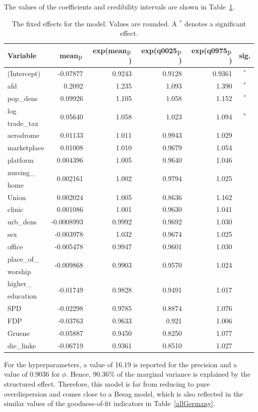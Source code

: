The values of the coefficients and credibility intervals are shown in Table~\ref{FixedAllGermany_spatial}.
\begin{table}[H]
\caption{The fixed effects for the model. Values are rounded. A $^*$ denotes a significant effect. \label{FixedAllGermany_spatial}}
\begin{tabular}{l r r r r c}
\toprule
\textbf{Variable}	& \textbf{mean$_{\hbox{p}}$}	& \textbf{exp(mean$_{\hbox{p}}$)} & \textbf{exp(q0025$_{\hbox{p}}$)} & \textbf{exp(q0975$_{\hbox{p}}$)} & \textbf{sig.}\\
\midrule
(Intercept) & -0.07877 & 0.9243 & 0.9128 & 0.9361 & $^*$\\
afd & 0.2092 & 1.235 & 1.093 & 1.390 & $^*$\\
pop\_dens & 0.09926 & 1.105 & 1.058 & 1.152 & $^*$\\
log & \multirow{2}{*}{0.05640} & \multirow{2}{*}{1.058} & \multirow{2}{*}{1.023} & \multirow{2}{*}{1.094} & \multirow{2}{*}{$^*$}\\
trade\_tax \\
aerodrome & 0.01133 & 1.011 & 0.9943 & 1.029 \\
marketplace & 0.01008 & 1.010 & 0.9679 & 1.054 \\
platform & 0.004396 & 1.005 & 0.9640 & 1.046 \\
nursing\_ & \multirow{2}{*}{0.002161} & \multirow{2}{*}{1.002} & \multirow{2}{*}{0.9794} & \multirow{2}{*}{1.025} \\
home\\
Union & 0.002024 & 1.005 & 0.8636 & 1.162\\
clinic & 0.001086 & 1.001 & 0.9630 & 1.041 \\
urb\_dens & -0.0008993 & 0.9992 & 0.9692 & 1.030 \\
sex & -0.003978 & 1.032 & 0.9674 & 1.025 & \\
office & -0.005478 & 0.9947 & 0.9601 & 1.030 \\
place\_of\_ & \multirow{2}{*}{-0.009868} & \multirow{2}{*}{0.9903} & \multirow{2}{*}{0.9570} & \multirow{2}{*}{1.024} \\
worship\\
higher\_ & \multirow{2}{*}{-0.01749} & \multirow{2}{*}{0.9828} & \multirow{2}{*}{0.9491} & \multirow{2}{*}{1.017} \\
education\\
SPD & -0.02298 & 0.9785 & 0.8874 & 1.076\\
FDP & -0.03763 & 0.9633 & 0.921& 1.006 \\
Gruene & -0.05887 & 0.9450 & 0.8250 & 1.077 \\
die\_linke & -0.06719 & 0.9361 & 0.8510 & 1.027\\
\bottomrule
\end{tabular}
\end{table}
For the hyperparameters, a value of 16.19 is reported for the precision and a value of 0.9036 for $\phi$. Hence, 90.36\% of the marginal variance is explained by the structured effect. Therefore, this model is far from reducing to pure overdispersion and comes close to a Besag model, which is also reflected in the similar values of the goodness-of-fit indicators in Table~\ref{allGermany}.

